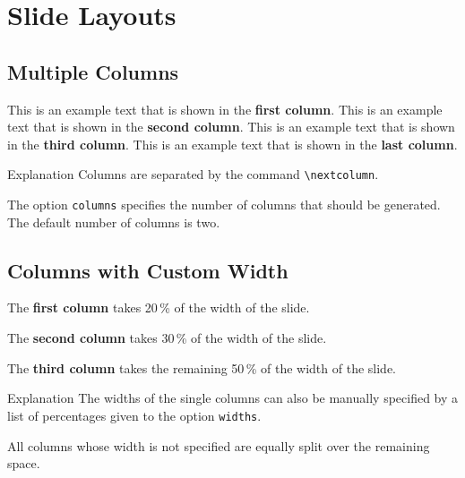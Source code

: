 \documentclass[
	aspectratio=169, %
	8pt, %
]{beamer}
\begin{document}
\section{Slide Layouts}

\subsection{Multiple Columns}
\begin{frame}{\insertsubsection}
	\begin{fancycolumns}[columns=4] %
		This is an example text that is shown in the \textbf{first column}.
	\nextcolumn
		This is an example text that is shown in the \textbf{second column}.
	\nextcolumn
		This is an example text that is shown in the \textbf{third column}.
	\nextcolumn
		This is an example text that is shown in the \textbf{last column}.
	\end{fancycolumns}
	\vfill
	\begin{note}{Explanation}
		Columns are separated by the command \texttt{\textbackslash nextcolumn}.

		The option \texttt{columns} specifies the number of columns that should be generated. The default number of columns is two.
	\end{note}
\end{frame}

\subsection{Columns with Custom Width}
\begin{frame}{\insertsubsection}
	\begin{fancycolumns}[columns=3,widths={20,30}]
		\begin{example}{}
			The \textbf{first column} takes 20\,\% of the width of the slide.
		\end{example}
	\nextcolumn
		\begin{example}{}
			The \textbf{second column} takes 30\,\% of the width of the slide.
		\end{example}
	\nextcolumn
		\begin{example}{}
			The \textbf{third column} takes the remaining 50\,\% of the width of the slide.
		\end{example}
	\end{fancycolumns}
	\vfill
	\begin{note}{Explanation}
		The widths of the single columns can also be manually specified by a list of percentages given to the option \texttt{widths}.

		All columns whose width is not specified are equally split over the remaining space.
	\end{note}
\end{frame}
\end{document}
